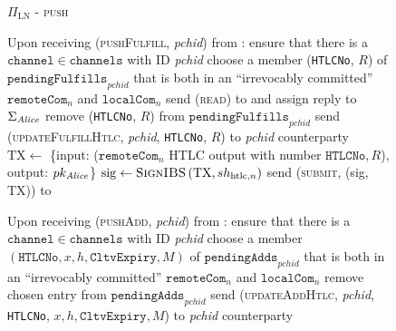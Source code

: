   \begin{figure}[H]
    \begin{protocolbox}{$\Pi_{\mathrm{LN}}$ - \textsc{push}}
      \begin{algorithmic}[1]
        \State Upon receiving (\textsc{pushFulfill}, \textit{pchid}) from
        \environment:
        \label{alg:protocol:pushfulfill:start}
        \Indent
          \State ensure that there is a $\mathtt{channel} \in \mathtt{channels}$
          with ID \textit{pchid}
          \State choose a member (\texttt{HTLCNo}, $R$) of
          $\mathtt{pendingFulfills}_{\mathit{pchid}}$ that is both in an
          ``irrevocably committed'' $\mathtt{remoteCom}_n$ and
          $\mathtt{localCom}_n$
          \State send (\textsc{read}) to \ledger{} and assign reply to
          $\Sigma_{\mathit{Alice}}$
          \State remove (\texttt{HTLCNo}, $R$) from
          $\mathtt{pendingFulfills}_{\mathit{pchid}}$
            \State send (\textsc{updateFulfillHtlc}, \textit{pchid},
            \texttt{HTLCNo}, $R$) to \textit{pchid} counterparty
          \Else \ 
            \State $\mathrm{TX} \gets$ \{input: ($\mathtt{remoteCom}_n$ HTLC
            output with number $\mathtt{HTLCNo}, R$), output:
            $pk_{\mathit{Alice}}$\}
            \State $\mathrm{sig} \gets \textsc{SignIBS}\left(\mathrm{TX},
            sh_{\mathrm{htlc}, n}\right)$
            \State send (\textsc{submit}, (sig, TX)) to \ledger{}
            \label{alg:protocol:pushfulfill:submit}
          \EndIf
          \label{alg:protocol:pushfulfill:end}
        \EndIndent
        \Statex

        \State Upon receiving (\textsc{pushAdd}, \textit{pchid}) from
        \environment:
        \label{alg:protocol:pushadd:start}
        \Indent
          \State ensure that there is a $\mathtt{channel} \in \mathtt{channels}$
          with ID \textit{pchid}
          \State choose a member $\left(\mathtt{HTLCNo}, x, h,
          \mathtt{CltvExpiry}, M\right)$ of
          $\mathtt{pendingAdds}_{\mathit{pchid}}$ that is both in an
          ``irrevocably committed'' $\mathtt{remoteCom}_n$ and
          $\mathtt{localCom}_n$
          \label{alg:protocol:pay:pushadd:choose}
          \State remove chosen entry from
          $\mathtt{pendingAdds}_{\mathit{pchid}}$
          \State send (\textsc{updateAddHtlc}, \textit{pchid}, \texttt{HTLCNo},
          $x, h, \mathtt{CltvExpiry}, M$) to \textit{pchid} counterparty
          \label{alg:protocol:pushadd:end}
        \EndIndent
        \Statex


\end{algorithmic}
\end{protocolbox}
\end{figure}
